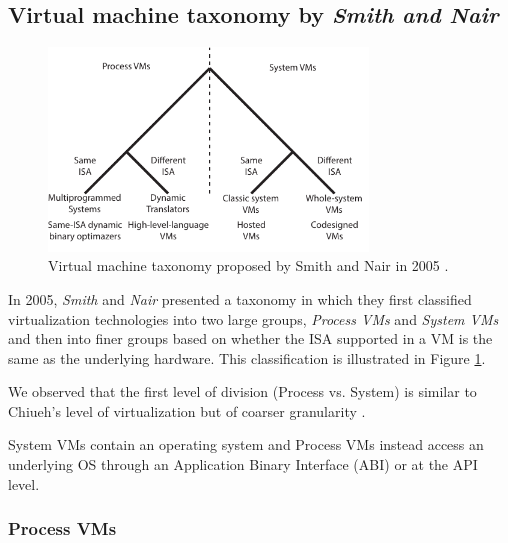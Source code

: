 	\subsection{Virtual machine taxonomy by \textit{Smith and Nair}}

	\begin{figure}[H]
		\centering
		\includegraphics[width=8.5cm]{images/Smith2005.pdf}
		\vspace{-0.2cm}
		\caption{Virtual machine taxonomy proposed by Smith and Nair in 2005 \cite{Smith2005}.}
		\label{fig:VMTaxonomySmithNair2005}
	\end{figure}
	
	In 2005, \textit{Smith} and \textit{Nair} presented a taxonomy in which they first classified virtualization technologies into two large groups,  \textit{Process VMs} and \textit{System VMs}  and then into finer groups based on whether the ISA supported in a VM is the same as the underlying hardware\cite {Smith2005}. This classification is illustrated in Figure \ref{fig:VMTaxonomySmithNair2005}. 
	
	 We observed that the first level of division (Process vs. System) is similar to Chiueh's level of virtualization but of coarser granularity \cite{Chiueh2005}. 
    
    System VMs contain an operating system and Process VMs instead access an underlying OS through an Application Binary Interface (ABI) or at the API level. 
	
    
    

	\subsubsection{Process VMs}
	
